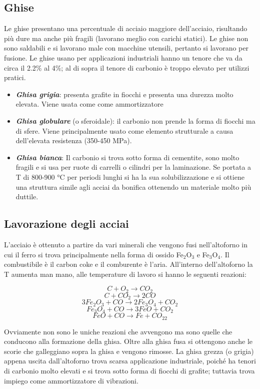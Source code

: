 \subsection{Ghise}

Le ghise presentano una percentuale di acciaio maggiore dell'acciaio, risultando più dure ma anche più fragili (lavorano meglio con carichi statici).
Le ghise non sono saldabili e si lavorano male con macchine utensili, pertanto si lavorano per fusione. Le ghise usano per applicazioni industriali hanno un tenore che va da circa il 2.2\% al 4\%; al di sopra il tenore di carbonio è troppo elevato per utilizzi pratici.
\begin{itemize}
    \item \textbf{\textit{Ghisa grigia}}: presenta grafite in fiocchi e presenta una durezza molto elevata. Viene usata come come ammortizzatore
    \item \textbf{\textit{Ghisa globulare}} (o sferoidale): il carbonio non prende la forma di fiocchi ma di sfere. Viene principalmente usato come elemento strutturale a causa dell'elevata resistenza (350-450 MPa). 
    \item \textbf{\textit{Ghisa bianca}}: Il carbonio si trova sotto forma di cementite, sono molto fragili e si usa per ruote di carrelli o cilindri per la laminazione. Se portata a T di 800-900 °C per periodi lunghi si ha la sua solubilizzazione e si ottiene una struttura simile agli acciai da bonifica ottenendo un materiale molto più duttile.
\end{itemize}

\subsection{Lavorazione degli acciai}

L'acciaio è ottenuto a partire da vari minerali che vengono fusi nell'altoforno in cui il ferro si trova principalmente nella forma di ossido Fe$_2$O$_3$ e Fe$_3$O$_4$. Il combustibile è il carbon coke e il comburente è l'aria.  All'interno dell'altoforno la T aumenta man mano, alle temperature di lavoro si hanno le seguenti reazioni:

$$C+O_2\rightarrow CO_2$$
$$C+CO_2\rightarrow 2CO$$
$$3Fe_2O_3+CO\rightarrow 2Fe_3O_4+CO_2$$
$$Fe_3O_4+CO\rightarrow 3FeO+CO_2$$
$$FeO+CO\rightarrow Fe+CO_22$$

Ovviamente non sono le uniche reazioni che avvengono ma sono quelle che conducono alla formazione della ghisa. Oltre alla ghisa fusa si ottengono anche le scorie che galleggiano sopra la ghisa e vengono rimosse. La ghisa grezza (o grigia) appena uscita dall'altoforno trova scarsa applicazione industriale, poiché ha tenori di carbonio molto elevati e si trova sotto forma di fiocchi di grafite; tuttavia trova impiego come ammortizzatore di vibrazioni.